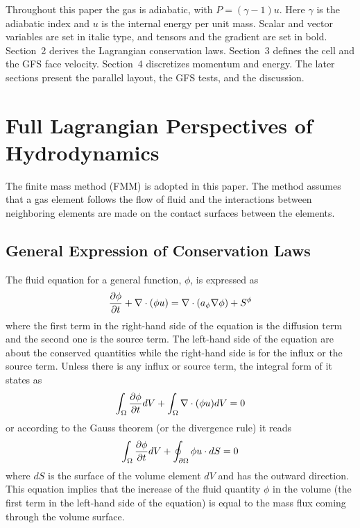 \documentclass[twocolumn]{aastex63}
\newcommand{\vel}{{u}}
\newcommand{\surf}[0]{S}
\begin{document}
Throughout this paper the gas is adiabatic, with $P = (\gamma-1)u$.
Here $\gamma$ is the adiabatic index and $u$ is the internal energy per unit mass.
Scalar and vector variables are set in italic type, and tensors and the gradient are set in bold.
Section~2 derives the Lagrangian conservation laws.
Section~3 defines the cell and the GFS face velocity.
Section~4 discretizes momentum and energy.
The later sections present the parallel layout, the GFS tests, and the discussion.

\section{Full Lagrangian Perspectives of Hydrodynamics}
The finite mass method (FMM) is adopted in this paper. The method assumes that a gas element follows the flow of fluid and the interactions between neighboring elements are made on the contact surfaces between the elements.

\subsection{General Expression of Conservation Laws}
The fluid equation for a general function, $\phi$, is expressed as
\begin{equation}\label{mcon}
	{\partial\phi\over \partial t} + \nabla\cdot (\phi\vel) = \nabla\cdot ( a_\phi\nabla\phi) +  \surf^\phi
\end{equation}
where the first term in the right-hand side of the equation is the diffusion term and the second one is the source term. The  left-hand side of the equation are about the conserved quantities while the right-hand side is for the influx or the source term. 
Unless there is any influx or source term, the integral form of it states as
\begin{equation}
	\int_{\Omega} {\partial\phi\over \partial
	t}dV + \int_{\Omega}  \nabla\cdot(\phi\vel) dV = 0
\end{equation}
or according to the Gauss theorem (or the divergence rule) it reads
\begin{equation}
	\int_{\Omega} {\partial\phi\over \partial t} dV + \oint_{\partial \Omega} \phi\vel\cdot d\surf = 0 
\end{equation}
where $d\surf$ is the surface of the volume element $dV$ and has the outward direction. This equation implies that the increase of the fluid quantity $\phi$  in the volume (the first term in the left-hand side of the equation) is equal to the mass flux coming through the volume surface.
\end{document}

